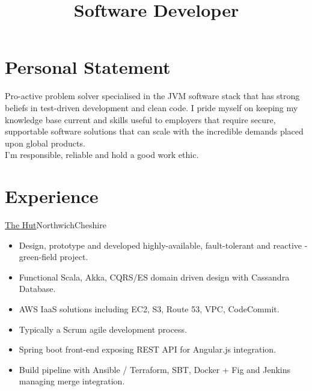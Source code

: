 \documentclass[a4paper,10pt]{moderncv}
\title{Software Developer}
\newcommand\weblink[2] {{\color{href} \href{#1}{#2}}}
\begin{document}
\maketitle

\section{Personal Statement}
Pro-active problem solver specialised in the JVM software stack that has strong beliefs in test-driven development and clean code.
I pride myself on keeping my knowledge base current and skills useful to employers that require secure, supportable software solutions that can scale with the incredible demands placed upon global products.\\

I'm responsible, reliable and hold a good work ethic.

\section{Experience}

{\weblink{http://www.thehutgroup.com}{The Hut}}{Northwich}{Cheshire}{
\begin{itemize}
  \item Design, prototype and developed highly-available, fault-tolerant and reactive - green-field project.
  \item Functional Scala, Akka, CQRS/ES domain driven design with Cassandra Database.
  \item AWS IaaS solutions including EC2, S3, Route 53, VPC, CodeCommit.
  \item Typically a Scrum agile development process.
  \item Spring boot front-end exposing REST API for Angular.js integration.
  \item Build pipeline with Ansible / Terraform, SBT, Docker + Fig and Jenkins managing merge integration.
\end{itemize}
}
\end{document}
